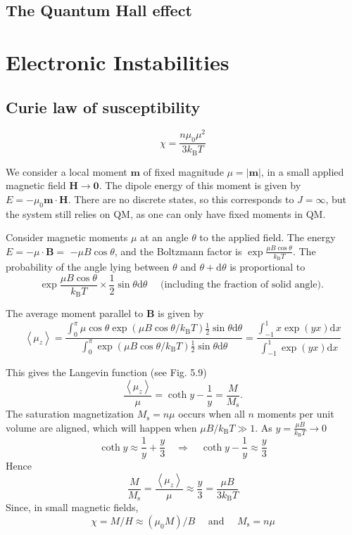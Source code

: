 \documentclass[12pt,a4paper]{article}
\begin{document}
\subsection{The Quantum Hall effect}
\section{Electronic Instabilities}
\subsection{Curie law of susceptibility}
$$
\chi=\frac{n \mu_0 \mu^2}{3 k_{\mathrm{B}} T}
$$

We consider a local moment $\boldsymbol{m}$ of fixed magnitude $\mu=|\boldsymbol{m}|$, in a small applied magnetic field $\boldsymbol{H} \rightarrow \mathbf{0}$. The dipole energy of this moment is given by $E=-\mu_0 \boldsymbol{m} \cdot \boldsymbol{H}$. There are no discrete states, so this corresponds to $J=\infty$, but the system still relies on QM, as one can only have fixed moments in QM.

Consider magnetic moments $\mu$ at an angle $\theta$ to the applied field. The energy $E=-\mu \cdot \boldsymbol{B}=$ $-\mu B \cos \theta$, and the Boltzmann factor is $\exp \frac{\mu B \cos \theta}{k_{\mathrm{B}} T}$. The probability of the angle lying between $\theta$ and $\theta+\mathrm{d} \theta$ is proportional to
$$
\exp \frac{\mu B \cos \theta}{k_{\mathrm{B}} T} \times \frac{1}{2} \sin \theta \mathrm{d} \theta \quad \text { (including the fraction of solid angle). }
$$

The average moment parallel to $\boldsymbol{B}$ is given by
$$
\left\langle\mu_z\right\rangle=\frac{\int_0^\pi \mu \cos \theta \exp \left(\mu B \cos \theta / k_{\mathrm{B}} T\right) \frac{1}{2} \sin \theta \mathrm{d} \theta}{\int_0^\pi \exp \left(\mu B \cos \theta / k_{\mathrm{B}} T\right) \frac{1}{2} \sin \theta \mathrm{d} \theta}=\frac{\int_{-1}^1 x \exp (y x) \mathrm{d} x}{\int_{-1}^1 \exp (y x) \mathrm{d} x}
$$

This gives the Langevin function (see Fig. 5.9)
$$
\frac{\left\langle\mu_z\right\rangle}{\mu}=\operatorname{coth} y-\frac{1}{y}=\frac{M}{M_{\mathrm{s}}} .
$$
The saturation magnetization $M_{\mathrm{s}}=n \mu$ occurs when all $n$ moments per unit volume are aligned, which will happen when $\mu B / k_{\mathrm{B}} T \gg 1$.
As $y=\frac{\mu B}{k_{\mathrm{B}} T} \rightarrow 0$
$$
\operatorname{coth} y \approx \frac{1}{y}+\frac{y}{3} \quad \Longrightarrow \quad \operatorname{coth} y-\frac{1}{y} \approx \frac{y}{3}
$$
Hence
$$
\frac{M}{M_{\mathrm{s}}}=\frac{\left\langle\mu_z\right\rangle}{\mu} \approx \frac{y}{3}=\frac{\mu B}{3 k_{\mathrm{B}} T}
$$
Since, in small magnetic fields,
$$
\chi=M / H \approx\left(\mu_0 M\right) / B \quad \text { and } \quad M_{\mathrm{s}}=n \mu
$$
\end{document}
